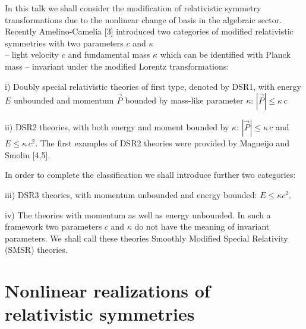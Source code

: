 \documentclass[a4paper,12pt]{article} \usepackage{times}
\begin{document}
In this talk we shall consider the modification of relativistic
symmetry transformations due to the nonlinear change of basis in
the algebraic sector. Recently Amelino-Camelia [3] introduced two
categories of modified relativistic symmetries with two parameters
$c$ and $\kappa$\\-- light velocity $c$ and fundamental mass
$\kappa$ which can be identified with Planck mass -- invariant
under the modified Lorentz transformations:
\begin{description}
\item{i)} Doubly special relativistic theories of first type, denoted by
DSR1, with energy $E$ unbounded and momentum $\vec{P}$ 
bounded by
mass-like parameter $\kappa$:  $|\vec{P}| \leq \kappa \, c$ \item{ii)}
DSR2 theories, with both energy and moment bounded by 
$\kappa$: $|\vec{P}|
\leq \kappa \, c$ and   $ E \leq \kappa \, c^2.$ The first examples of
DSR2 theories were provided by Magueijo and Smolin [4,5].
\end{description} In  order to complete the classification we shall
introduce further two categories:

\begin{description}
\item{iii)}  DSR3 theories, with momentum unbounded and energy
bounded: $E \leq \kappa c^2$.
\item{iv)} The theories with momentum as well as energy 
unbounded. In such
a framework two parameters $c$ and $\kappa$ do not have the 
meaning of
invariant parameters. We shall call these theories Smoothly 
Modified
Special Relativity (SMSR) theories. \end{description}


\section{Nonlinear realizations of relativistic symmetries}
\end{document}
